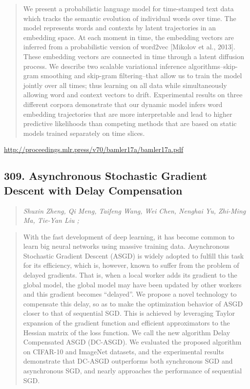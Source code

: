 \documentclass{article}
\begin{document}
\begin{quote}
    We present a probabilistic language model for time-stamped text data which tracks the semantic evolution of individual words over time. The model represents words and contexts by latent trajectories in an embedding space. At each moment in time, the embedding vectors are inferred from a probabilistic version of word2vec [Mikolov et al., 2013]. These embedding vectors are connected in time through a latent diffusion process. We describe two scalable variational inference algorithms–skip-gram smoothing and skip-gram filtering–that allow us to train the model jointly over all times; thus learning on all data while simultaneously allowing word and context vectors to drift. Experimental results on three different corpora demonstrate that our dynamic model infers word embedding trajectories that are more interpretable and lead to higher predictive likelihoods than competing methods that are based on static models trained separately on time slices.  
\end{quote}

\href{http://proceedings.mlr.press/v70/bamler17a/bamler17a.pdf}{http://proceedings.mlr.press/v70/bamler17a/bamler17a.pdf}

\subsection{309. Asynchronous Stochastic Gradient Descent with Delay Compensation}

\begin{quote}
\footnotesize{\textit{Shuxin Zheng, Qi Meng, Taifeng Wang, Wei Chen, Nenghai Yu, Zhi-Ming Ma, Tie-Yan Liu ;}}

\end{quote}

\begin{quote}
    With the fast development of deep learning, it has become common to learn big neural networks using massive training data. Asynchronous Stochastic Gradient Descent (ASGD) is widely adopted to fulfill this task for its efficiency, which is, however, known to suffer from the problem of delayed gradients. That is, when a local worker adds its gradient to the global model, the global model may have been updated by other workers and this gradient becomes “delayed”. We propose a novel technology to compensate this delay, so as to make the optimization behavior of ASGD closer to that of sequential SGD. This is achieved by leveraging Taylor expansion of the gradient function and efficient approximators to the Hessian matrix of the loss function. We call the new algorithm Delay Compensated ASGD (DC-ASGD). We evaluated the proposed algorithm on CIFAR-10 and ImageNet datasets, and the experimental results demonstrate that DC-ASGD outperforms both synchronous SGD and asynchronous SGD, and nearly approaches the performance of sequential SGD.  
\end{quote}
\end{document}
